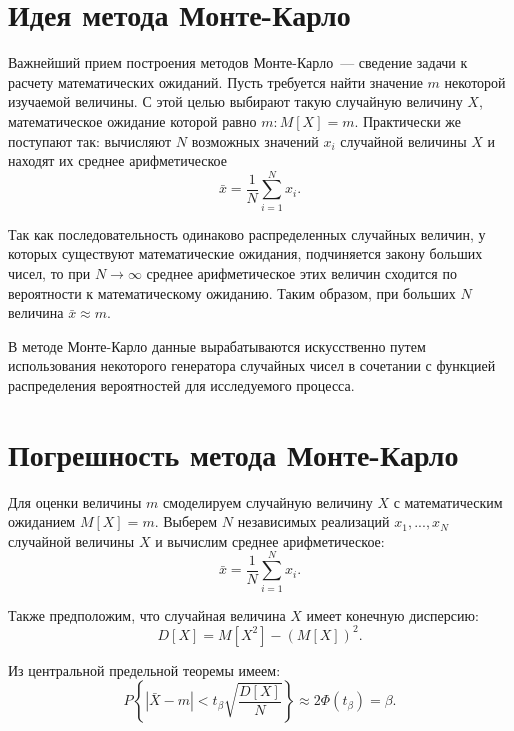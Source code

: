 \documentclass[a4paper,12pt]{article}
\begin{document}
\newpage
\section{Идея метода Монте-Карло}

Важнейший прием построения методов Монте-Карло~--- сведение задачи к расчету математических ожиданий. Пусть требуется найти значение $m$ некоторой изучаемой величины. С этой целью выбирают такую случайную величину $X$, математическое ожидание которой равно $m : M[X] = m$. Практически же поступают так: вычисляют $N$ возможных значений $x_i$ случайной величины $X$ и находят их среднее арифметическое
\[
	\bar{x} = \frac{1}{N} \sum_{i=1}^N x_i.
\]

Так как последовательность одинаково распределенных случайных величин, у которых существуют математические ожидания, подчиняется закону больших чисел, то при $N \to \infty $ среднее арифметическое этих величин сходится по вероятности к математическому ожиданию. Таким образом, при больших $N$ величина $\bar{x} \approx m $.

В методе Монте-Карло данные вырабатываются искусственно путем использования некоторого генератора случайных чисел в сочетании с функцией распределения вероятностей для исследуемого процесса.



\newpage
\section{Погрешность метода Монте-Карло}

Для оценки величины $m$ смоделируем случайную величину $X$ с математическим ожиданием $M[X]=m$. Выберем $N$ независимых реализаций $x_1,...,x_N$ случайной величины $X$ и вычислим среднее арифметическое:
\[
	\bar{x} = \frac{1}{N} \sum_{i=1}^N x_i.
\]

Также предположим, что случайная величина $X$ имеет конечную дисперсию:
\[
	D[X] = M[X^2] - (M[X])^2.
\]

Из центральной предельной теоремы имеем:
\begin{equation}
	P \left \{ |\bar{X} - m| < t_\beta \sqrt{\frac{D[X]}{N}} \right \} \approx 2\Phi(t_\beta) = \beta.
\end{equation}
\end{document}
